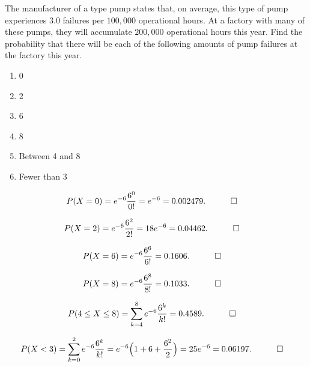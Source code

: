 \begin{hwkProblem}{3}{}

	The manufacturer of a type pump states that, on average, this type of pump experiences \( 3.0 \) failures per \( 100,000 \) operational hours. At a factory with many of these pumps, they will accumulate \( 200,000 \) operational hours this year. Find the probability that there will be each of the following amounts of pump failures at the factory this year.
	\begin{enumerate}
		\item 0
		\item 2
		\item 6
		\item 8
		\item Between 4 and 8
		\item Fewer than 3
	\end{enumerate}

	\hwkSol

	\hwkPart
	\begin{align*}
		P(X=0)&= e^{-6}\frac{6^0}{0!}= e^{-6} = 0.002479. \quad \qed
	\end{align*}

	\hwkPart
	\begin{align*}
		P(X=2)&= e^{-6}\frac{6^2}{2!}= 18e^{-6}=0.04462. \quad \qed
	\end{align*}

	\hwkPart
	\begin{align*}
		P(X=6)&= e^{-6}\frac{6^6}{6!}=0.1606. \quad \qed
	\end{align*}

	\hwkPart
	\begin{align*}
		P(X=8)&= e^{-6}\frac{6^8}{8!}=0.1033. \quad \qed
	\end{align*}

	\hwkPart
	\begin{align*}
		P(4\le X\le 8)&= \sum_{k=4}^{8} e^{-6}\frac{6^k}{k!}=0.4589. \quad \qed
	\end{align*}

	\hwkPart
	\begin{align*}
		P(X<3)&= \sum_{k=0}^{2} e^{-6}\frac{6^k}{k!}
		= e^{-6}\Bigl(1+6+\frac{6^2}{2}\Bigr)
		= 25e^{-6}=0.06197. \quad \qed
	\end{align*}

\end{hwkProblem}

